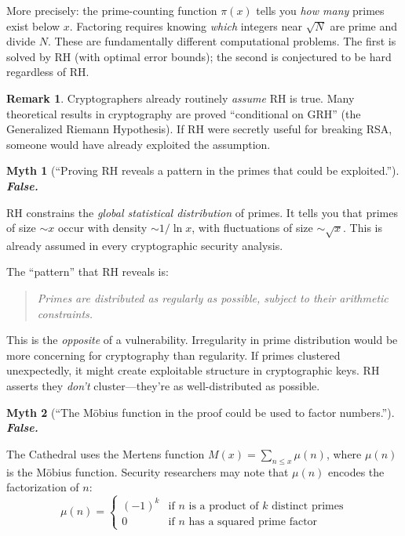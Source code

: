 \documentclass[11pt,a4paper]{article}
\theoremstyle{definition}
\newtheorem{remark}[theorem]{Remark}
\theoremstyle{plain}
\newtheorem{myth}{Myth}
\begin{document}
More precisely: the prime-counting function $\pi(x)$ tells you
\emph{how many} primes exist below $x$. Factoring requires knowing
\emph{which} integers near $\sqrt{N}$ are prime and divide $N$.
These are fundamentally different computational problems. The first
is solved by RH (with optimal error bounds); the second is
conjectured to be hard regardless of RH.

\begin{remark}
Cryptographers already routinely \emph{assume} RH is true. Many
theoretical results in cryptography are proved ``conditional on GRH''
(the Generalized Riemann Hypothesis). If RH were secretly useful for
breaking RSA, someone would have already exploited the assumption.
\end{remark}

\begin{myth}[``Proving RH reveals a pattern in the primes that
could be exploited.'']
\label{myth:pattern}
\textbf{False.}
\end{myth}

RH constrains the \emph{global statistical distribution} of primes.
It tells you that primes of size $\sim x$ occur with density
$\sim 1/\ln x$, with fluctuations of size $\sim \sqrt{x}$. This is
already assumed in every cryptographic security analysis.

The ``pattern'' that RH reveals is:
\begin{quote}
\emph{Primes are distributed as regularly as possible, subject to
their arithmetic constraints.}
\end{quote}

This is the \emph{opposite} of a vulnerability. Irregularity in
prime distribution would be more concerning for cryptography than
regularity. If primes clustered unexpectedly, it might create
exploitable structure in cryptographic keys. RH asserts they
\emph{don't} cluster---they're as well-distributed as possible.

\begin{myth}[``The Möbius function in the proof could be used
to factor numbers.'']
\label{myth:mobius}
\textbf{False.}
\end{myth}

The Cathedral uses the Mertens function $M(x) = \sum_{n \leq x} \mu(n)$,
where $\mu(n)$ is the M\"obius function. Security researchers may note
that $\mu(n)$ encodes the factorization of $n$:
\[
  \mu(n) = \begin{cases}
    (-1)^k & \text{if } n \text{ is a product of } k \text{ distinct primes} \\
    0 & \text{if } n \text{ has a squared prime factor}
  \end{cases}
\]
\end{document}

